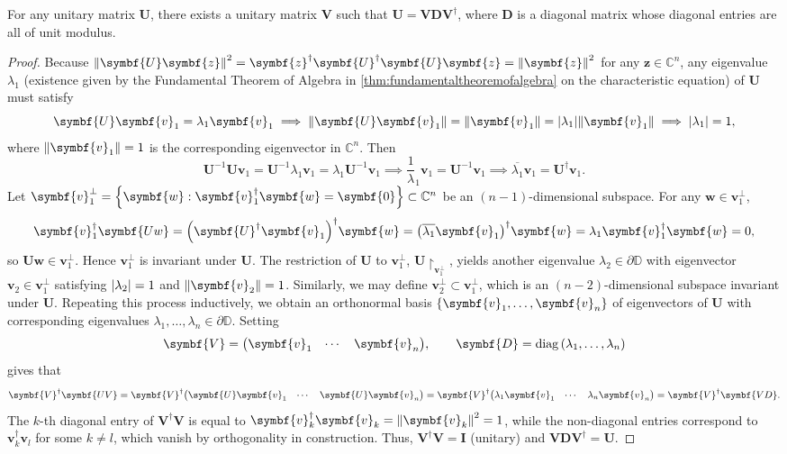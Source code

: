\begin{theorem}\label{thm:unitaryspectraltheorem}
    For any unitary matrix \(\symbf{U}\), there exists a unitary matrix \(\symbf{V}\) such that \(\symbf{U}=\symbf{VD}\symbf{V}^\dagger\), where \(\symbf{D}\) is a diagonal matrix whose diagonal entries are all of unit modulus.
\end{theorem}
\begin{proof}
    Because \(\norm{\symbf{U}\symbf{z}}^2=\symbf{z}^\dagger\symbf{U}^\dagger\symbf{U}\symbf{z}=\norm{\symbf{z}}^2\) for any \(\symbf{z}\in\mathbb{C}^n\), any eigenvalue \(\lambda_1\) (existence given by the Fundamental Theorem of Algebra in \cref{thm:fundamentaltheoremofalgebra} on the characteristic equation) of \(\symbf{U}\) must satisfy \[\symbf{U}\symbf{v}_1=\lambda_1\symbf{v}_1\implies\norm{\symbf{U}\symbf{v}_1}=\norm{\symbf{v}_1}=\abs{\lambda_1}\norm{\symbf{v}_1}\implies\abs{\lambda_1}=1,\]
    where \(\norm{\symbf{v}_1}=1\) is the corresponding eigenvector in \(\mathbb{C}^n\). Then \[\symbf{U}^{-1}\symbf{U}\symbf{v}_1=\symbf{U}^{-1}\lambda_1\symbf{v}_1=\lambda_1\symbf{U}^{-1}\symbf{v}_1\implies\frac1\lambda_1\symbf{v}_1=\symbf{U}^{-1}\symbf{v}_1\implies\overline{\lambda_1}\symbf{v}_1=\symbf{U}^\dagger\symbf{v}_1.\]
    Let \(\symbf{v}_1^\perp=\cbraces{\symbf{w}:\symbf{v}_1^\dagger\symbf{w}=\symbf{0}}\subset\mathbb{C}^n\) be an \((n-1)\)-dimensional subspace. For any \(\symbf{w}\in\symbf{v}_1^\perp\),
    \[\symbf{v}_1^\dagger\symbf{Uw}=\qty(\symbf{U}^\dagger\symbf{v}_1)^\dagger\symbf{w}=\qty(\overline{\lambda_1}\symbf{v}_1)^\dagger\symbf{w}=\lambda_1\symbf{v}_1^\dagger\symbf{w}=0,\]
    so \(\symbf{Uw}\in\symbf{v}_1^\perp\). Hence \(\symbf{v}_1^\perp\) is invariant under \(\symbf{U}\). The restriction of \(\symbf{U}\) to \(\symbf{v}_1^\perp\), \(\symbf{U}{\restriction_{\symbf{v}_1^\perp}}\), yields another eigenvalue \(\lambda_2\in\partial\mathbb{D}\) with eigenvector \(\symbf{v}_2\in\symbf{v}_1^\perp\) satisfying \(\abs{\lambda_2}=1\) and \(\norm{\symbf{v}_2}=1\). Similarly, we may define \(\symbf{v}_2^\perp\subset\symbf{v}_1^\perp\), which is an \((n-2)\)-dimensional subspace invariant under \(\symbf{U}\). Repeating this process inductively, we obtain an orthonormal basis \(\cbraces{\symbf{v}_1,\ldots,\symbf{v}_n}\) of eigenvectors of \(\symbf{U}\) with corresponding eigenvalues \(\lambda_1,\ldots,\lambda_n\in\partial\mathbb{D}\). Setting \[\symbf{V}=\mqty(\symbf{v}_1&\cdots&\symbf{v}_n),\qquad\symbf{D}=\operatorname{diag}\qty(\lambda_1,\ldots,\lambda_n)\] gives that \[\symbf{V}^\dagger\symbf{UV}=\symbf{V}^\dagger\mqty(\symbf{U}\symbf{v}_1&\cdots&\symbf{U}\symbf{v}_n)=\symbf{V}^\dagger\mqty(\lambda_1\symbf{v}_1&\cdots&\lambda_n\symbf{v}_n)=\symbf{V}^\dagger\symbf{VD}.\]
    The \(k\)-th diagonal entry of \(\symbf{V}^\dagger\symbf{V}\) is equal to \(\symbf{v}_k^\dagger\symbf{v}_k=\norm{\symbf{v}_k}^2=1\), while the non-diagonal entries correspond to \(\symbf{v}_k^\dagger\symbf{v}_l\) for some \(k\neq l\), which vanish by orthogonality in construction. Thus, \(\symbf{V}^\dagger\symbf{V}=\symbf{I}\) (unitary) and \(\symbf{VD}\symbf{V}^\dagger=\symbf{U}\).
\end{proof}
